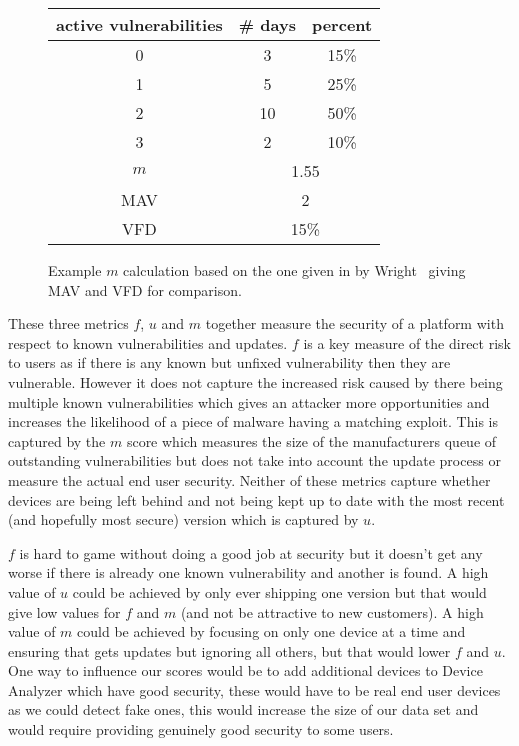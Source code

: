 \begin{figure}
\centering

\begin{tabular}{c|c|c}
active vulnerabilities & \# days & percent\\
\hline
0 & 3 & 15\%\\
1 & 5 & 25\%\\
2 & 10 & 50\%\\
3 & 2 & 10\%\\
\hline
\hline
$m$ & \multicolumn{2}{c}{1.55}\\
MAV & \multicolumn{2}{c}{2}\\
VFD & \multicolumn{2}{c}{15\%}\\

\end{tabular}
\caption{Example $m$ calculation based on the one given in by Wright~\cite{Wright2014} giving MAV and VFD for comparison.}
\label{fig:mcalculation}
\end{figure}

These three metrics $f$, $u$ and $m$ together measure the security of a platform with respect to known vulnerabilities and updates.
$f$ is a key measure of the direct risk to users as if there is any known but unfixed vulnerability then they are vulnerable.
However it does not capture the increased risk caused by there being multiple known vulnerabilities which gives an attacker more opportunities and increases the likelihood of a piece of malware having a matching exploit.
This is captured by the $m$ score which measures the size of the manufacturers queue of outstanding vulnerabilities but does not take into account the update process or measure the actual end user security.
Neither of these metrics capture whether devices are being left behind and not being kept up to date with the most recent (and hopefully most secure) version which is captured by $u$.

$f$ is hard to game without doing a good job at security but it doesn't get any worse if there is already one known vulnerability and another is found.
A high value of $u$ could be achieved by only ever shipping one version but that would give low values for $f$ and $m$ (and not be attractive to new customers).
A high value of $m$ could be achieved by focusing on only one device at a time and ensuring that gets updates but ignoring all others, but that would lower $f$ and $u$.
One way to influence our scores would be to add additional devices to Device Analyzer which have good security, these would have to be real end user devices as we could detect fake ones, this would increase the size of our data set and would require providing genuinely good security to some users.

